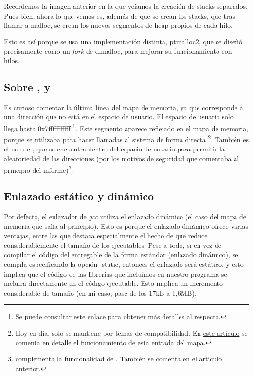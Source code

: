 \documentclass[a4paper]{article}
\begin{document}
Recordemos la imagen anterior en la que veíamos la creación de stacks separados. Pues bien, ahora lo que vemos es, además de que se crean los stacks, que tras llamar a {\ttfamily malloc}, se crean los nuevos segmentos de heap propios de cada hilo.

Esto es así porque se usa una implementación distinta, {\ttfamily ptmalloc2}, que se diseñó precisamente como un \emph{fork} de {\ttfamily dlmalloc}, para mejorar su funcionamiento con hilos.

\subsection{Sobre {\ttfamily [vsyscall]}, {\ttfamily [vdso]} y {\ttfamily [vvar]}}

Es curioso comentar la última línea del mapa de memoria, ya que corresponde a una dirección que no está en el espacio de usuario. El espacio de usuario solo llega hasta {\ttfamily 0x7fffffffffff} \footnote{Se puede consultar \href{https://www.kernel.org/doc/Documentation/x86/x86_64/mm.txt}{este enlace} para obtener más detalles al respecto.}. Este segmento aparece reflejado en el mapa de memoria, porque se utilizaba para hacer llamadas al sistema de forma directa \footnote{Hoy en día, solo se mantiene por temas de compatibilidad. En \href{https://lwn.net/Articles/446528/}{este artículo} se comenta en detalle el funcionamiento de esta entrada del mapa.}. También es el uso de {\ttfamily [vdso]}, que se encuentra dentro del espacio de usuario para permitir la aleatoriedad de las direcciones (por los motivos de seguridad que comentaba al principio del informe)\footnote{{\ttfamily [vvar]} complementa la funcionalidad de {\ttfamily [vdso]}. También se comenta en el artículo anterior.}.

\subsection{Enlazado estático y dinámico}

Por defecto, el enlazador de \emph{gcc} utiliza el enlazado dinámico (el caso del mapa de memoria que salía al principio). Esto es porque el enlazado dinámico ofrece varias ventajas, entre las que destaca especialmente el hecho de que reduce considerablemente el tamaño de los ejecutables. Pese a todo, si en vez de compilar el código del entregable de la forma estándar (enlazado dinámico), se compila especificando la opción {\ttfamily -static}, entonces el enlazado será estático, y esto implica que el código de las librerías que incluímos en nuestro programa se incluirá directamente en el código ejecutable. Esto implica un incremento considerable de tamaño (en mi caso, pasé de los 17kB a 1,6MB).
\end{document}
